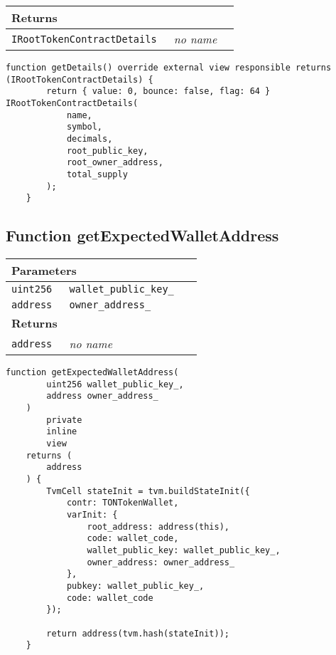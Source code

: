 \ifsoltables
\noindent\begin{tabular}{|l|l|p{5cm}|}\hline
\multicolumn{3}{|l|}{\bf Returns}\\\hline
\tt IRootTokenContractDetails & {\em no name} &\\\hline
\end{tabular}
\fi

\vspace{2cm}

\begin{lstlisting}[firstnumber=77]
    function getDetails() override external view responsible returns (IRootTokenContractDetails) {
        return { value: 0, bounce: false, flag: 64 } IRootTokenContractDetails(
            name,
            symbol,
            decimals,
            root_public_key,
            root_owner_address,
            total_supply
        );
    }
\end{lstlisting}

\subsection{Function getExpectedWalletAddress}


\ifsoltables
\noindent\begin{tabular}{|l|l|p{5cm}|}\hline
\multicolumn{3}{|l|}{\bf Parameters}\\\hline
\tt uint256 & \tt wallet\_{}public\_{}key\_{} &\\\hline
\tt address & \tt owner\_{}address\_{} &\\\hline
\multicolumn{3}{|l|}{\bf Returns}\\\hline
\tt address & {\em no name} &\\\hline
\end{tabular}
\fi

\vspace{2cm}

\begin{lstlisting}[firstnumber=485]
    function getExpectedWalletAddress(
        uint256 wallet_public_key_,
        address owner_address_
    )
        private
        inline
        view
    returns (
        address
    ) {
        TvmCell stateInit = tvm.buildStateInit({
            contr: TONTokenWallet,
            varInit: {
                root_address: address(this),
                code: wallet_code,
                wallet_public_key: wallet_public_key_,
                owner_address: owner_address_
            },
            pubkey: wallet_public_key_,
            code: wallet_code
        });

        return address(tvm.hash(stateInit));
    }
\end{lstlisting}

